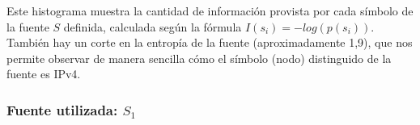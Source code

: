 \documentclass[final,narroweqnarray,inline]{ieee}
\begin{document}
Este histograma muestra la cantidad de información provista por cada símbolo
de la fuente $S$ definida, calculada según la fórmula $ I(s_{i}) =
-log(p(s_{i}))  $. También hay un corte en la entropía de la fuente
(aproximadamente 1,9), que nos permite observar de manera sencilla cómo el símbolo (nodo)
distinguido de la fuente es IPv4.

\subsubsection{Fuente utilizada: $S_{1}$}










\end{document}

